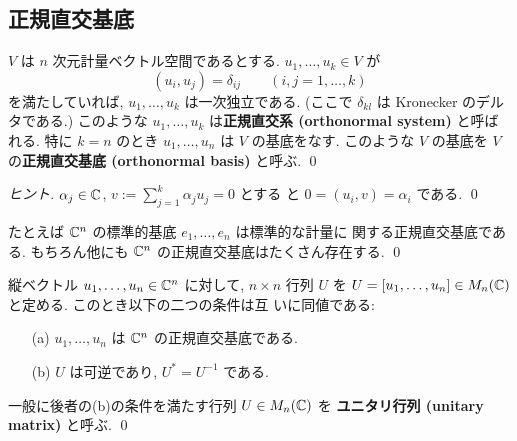 \documentclass[12pt,twoside]{jarticle}
\begin{document}

\subsection{正規直交基底}
\label{sec:ONB}


\begin{question}[正規直交基底]
  $V$ は $n$ 次元計量ベクトル空間であるとする.
  $u_1,\ldots,u_k\in V$ が
  \begin{equation*}
    (u_i,u_j) = \delta_{ij}
    \qquad (i,j=1,\ldots,k)
  \end{equation*}
  を満たしていれば, $u_1,\ldots,u_k$ は一次独立である.
  (ここで $\delta_{kl}$ は Kronecker のデルタである.)
  このような $u_1,\ldots,u_k$ は{\bf 正規直交系 (orthonormal system)} 
  と呼ばれる.
  特に $k=n$ のとき $u_1,\ldots,u_n$ は $V$ の基底をなす.
  このような $V$ の基底を $V$ の{\bf 正規直交基底 (orthonormal basis)}
  と呼ぶ. \qed
\end{question}

\begin{proof}[ヒント]
  $\alpha_j\in{\mathbb C}$, $v:=\sum_{j=1}^k\alpha_ju_j=0$ とする
  と $0=(u_i,v)=\alpha_i$ である. \qed
\end{proof}

\begin{example}
  たとえば ${\mathbb C}^n$ の標準的基底 $e_1,\ldots,e_n$ は標準的な計量に
  関する正規直交基底である. 
  もちろん他にも ${\mathbb C}^n$ の正規直交基底はたくさん存在する.
  \qed
\end{example}


\begin{question}[ユニタリ行列]
  縦ベクトル $u_1,\ldots,u_n\in{\mathbb C}^n$ に対して, $n\times n$ 行列 $U$ 
  を $U=[u_1,\ldots,u_n]\in M_n({\mathbb C})$ と定める. このとき以下の二つの条件は互
  いに同値である:
  \begin{itemize}
  \item[(a)] $u_1,\ldots,u_n$ は ${\mathbb C}^n$ の正規直交基底である.
  \item[(b)] $U$ は可逆であり, $U^* = U^{-1}$ である.
  \end{itemize}
  一般に後者の(b)の条件を満たす行列 $U\in M_n({\mathbb C})$ を
  {\bf ユニタリ行列 (unitary matrix)} と呼ぶ. 
  \qed
\end{question}
\end{document}
